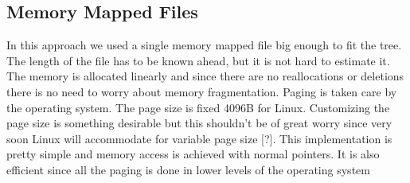 \documentclass[12pt,letterpaper,doublespaced,ETD,dvips,proposal]{gtthesis}
\begin{document}
\begin{Body}
\subsection{Memory Mapped Files} In this approach we used a single
memory mapped file big enough to fit the tree. The length of the
file has to be known ahead, but it is not hard to estimate it. The
memory is allocated linearly and since there are no reallocations or
deletions there is no need to worry about memory fragmentation.
Paging is taken care by the operating system. The page size is fixed
4096B for Linux. Customizing the page size is something desirable
but this shouldn't be of great worry since very soon Linux will
accommodate for variable page size [?]. This implementation is
pretty simple and memory access is achieved with normal pointers. It
is also efficient since all the paging is done in lower levels of
the operating system


\end{Body}
\end{document}
